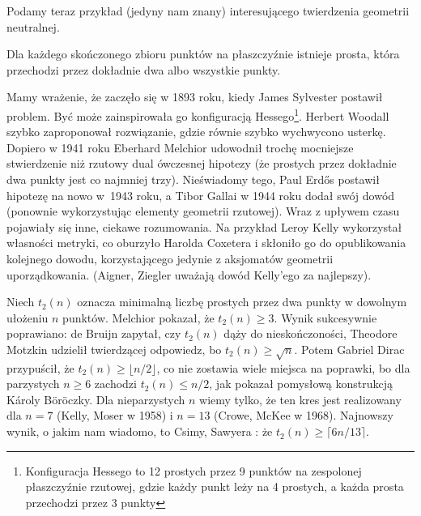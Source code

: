 Podamy teraz przykład (jedyny nam znany) interesującego twierdzenia geometrii neutralnej.

\begin{theorem}
	Dla każdego skończonego zbioru punktów na płaszczyźnie istnieje prosta, która przechodzi przez dokładnie dwa albo wszystkie punkty.
\end{theorem}

Mamy wrażenie, że zaczęło się w 1893 roku, kiedy James Sylvester postawił problem.
%
Być może zainspirowała go konfiguracją Hessego\footnote{Konfiguracja Hessego to 12 prostych przez 9 punktów na zespolonej płaszczyźnie rzutowej, gdzie każdy punkt leży na 4 prostych, a każda prosta przechodzi przez 3 punkty}.
%
Herbert Woodall szybko zaproponował rozwiązanie, gdzie równie szybko wychwycono usterkę.
%
Dopiero w 1941 roku Eberhard Melchior udowodnił trochę mocniejsze stwierdzenie niż rzutowy dual ówczesnej hipotezy (że prostych przez dokładnie dwa punkty jest co najmniej trzy).
%
Nieświadomy tego, Paul Erdős postawił hipotezę na nowo w~1943 roku, a Tibor Gallai w 1944 roku dodał swój dowód (ponownie wykorzystując elementy geometrii rzutowej).
%
%
Wraz z upływem czasu pojawiały się inne, ciekawe rozumowania.
Na przykład Leroy Kelly wykorzystał własności metryki, co oburzyło Harolda Coxetera \cite[s. 199-201]{coxeter_1967} i skłoniło go do opublikowania kolejnego dowodu, korzystającego jedynie z aksjomatów geometrii uporządkowania.
%
%
(Aigner, Ziegler uważają dowód Kelly'ego za najlepszy).

Niech $t_2(n)$ oznacza minimalną liczbę prostych przez dwa punkty w dowolnym ułożeniu $n$ punktów.
Melchior pokazał, że $t_2(n) \ge 3$.
Wynik sukcesywnie poprawiano:
de Bruijn \cite{debruijn_1948} zapytał, czy $t_2(n)$ dąży do nieskończoności,
%
Theodore Motzkin \cite{motzkin_1951} udzielił twierdzącej odpowiedz, bo $t_2(n) \ge \sqrt{n}$.
%
Potem Gabriel Dirac \cite{dirac_1951} przypuścił, że $t_2(n) \ge \lfloor n/2\rfloor$, co nie zostawia wiele miejsca na poprawki, bo dla parzystych $n \ge 6$ zachodzi $t_2(n) \le n/2$, jak pokazał pomysłową konstrukcją Károly Böröczky.
%
%
Dla nieparzystych $n$ wiemy tylko, że ten kres jest realizowany dla $n = 7$ (Kelly, Moser \cite{kelly_1958} w 1958) i $n = 13$ (Crowe, McKee \cite{mckee_1968} w 1968).
%
%
%
Najnowszy wynik, o jakim nam wiadomo, to Csimy, Sawyera \cite{csima_1993}: że $t_2(n) \ge \lceil 6n/13 \rceil$.
%
%
